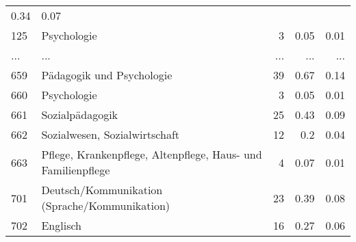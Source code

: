 \begin{longtable}{lXrrr}
          \num[round-mode=places,round-precision=2]{0.34} &
          \num[round-mode=places,round-precision=2]{0.07} \\
        125 & \multicolumn{1}{X}{Psychologie} & %
          \num{3} &
          \num[round-mode=places,round-precision=2]{0.05} &
          \num[round-mode=places,round-precision=2]{0.01} \\
       ... & ... & ... & ... & ... \\
        659 & \multicolumn{1}{X}{Pädagogik und Psychologie} & %
          \num{39} &
          \num[round-mode=places,round-precision=2]{0.67} &
          \num[round-mode=places,round-precision=2]{0.14} \\

        660 & \multicolumn{1}{X}{Psychologie} & %
          \num{3} &
          \num[round-mode=places,round-precision=2]{0.05} &
          \num[round-mode=places,round-precision=2]{0.01} \\

        661 & \multicolumn{1}{X}{Sozialpädagogik} & %
          \num{25} &
          \num[round-mode=places,round-precision=2]{0.43} &
          \num[round-mode=places,round-precision=2]{0.09} \\

        662 & \multicolumn{1}{X}{Sozialwesen, Sozialwirtschaft} & %
          \num{12} &
          \num[round-mode=places,round-precision=2]{0.2} &
          \num[round-mode=places,round-precision=2]{0.04} \\

        663 & \multicolumn{1}{X}{Pflege, Krankenpflege, Altenpflege, Haus- und Familienpflege} & %
          \num{4} &
          \num[round-mode=places,round-precision=2]{0.07} &
          \num[round-mode=places,round-precision=2]{0.01} \\

        701 & \multicolumn{1}{X}{Deutsch/Kommunikation (Sprache/Kommunikation)} & %
          \num{23} &
          \num[round-mode=places,round-precision=2]{0.39} &
          \num[round-mode=places,round-precision=2]{0.08} \\

        702 & \multicolumn{1}{X}{Englisch} & %
          \num{16} &
          \num[round-mode=places,round-precision=2]{0.27} &
          \num[round-mode=places,round-precision=2]{0.06} \\


\end{longtable}
